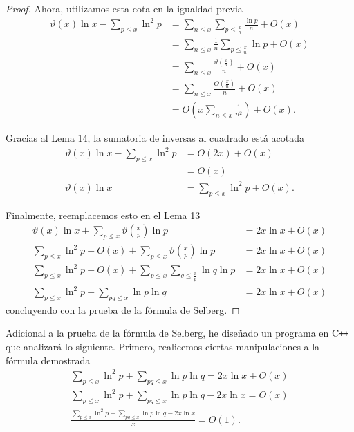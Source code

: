 \documentclass{article}
\theoremstyle{definition}
\theoremstyle{remark}
\begin{document}
\begin{proof}
Ahora, utilizamos esta cota en la igualdad previa
\begin{align*}
\vartheta(x)\ln x - \sum_{p \leq x} \ln^2 p &= \sum_{n \leq x} \sum_{p \leq \frac{x}{n}} \frac{\ln p}{n} + O(x) \\
&= \sum_{n \leq x} \frac{1}{n}\sum_{p \leq \frac{x}{n}} \ln p + O(x) \\
&= \sum_{n \leq x} \frac{\vartheta\left(\frac{x}{n}\right)}{n} + O(x) \\
&= \sum_{n \leq x} \frac{O\left(\frac{x}{n}\right)}{n} + O(x) \\
&= O\left(x \sum_{n \leq x} \frac{1}{n^2}\right) + O(x).
\end{align*}

Gracias al Lema 14, la sumatoria de inversas al cuadrado est\'a acotada
\begin{align*}
\vartheta(x)\ln x - \sum_{p \leq x} \ln^2 p &= O(2x) + O(x) \\
&= O(x)\\
\vartheta(x)\ln x &= \sum_{p \leq x} \ln^2 p + O(x).
\end{align*}

Finalmente, reemplacemos esto en el Lema 13
\begin{align*}
\vartheta(x)\ln x + \sum_{p \leq x} \vartheta\left(\frac{x}{p}\right)\ln p &= 2x\ln x + O(x) \\
\sum_{p \leq x} \ln^2 p + O(x) + \sum_{p \leq x} \vartheta\left(\frac{x}{p}\right)\ln p &= 2x\ln x + O(x) \\
\sum_{p \leq x} \ln^2 p + O(x) + \sum_{p \leq x} \sum_{q \leq \frac{x}{p}} \ln q \ln p &= 2x\ln x + O(x) \\
\sum_{p \leq x} \ln^2 p + \sum_{pq \leq x} \ln p \ln q &= 2x\ln x + O(x)
\end{align*}
concluyendo con la prueba de la f\'ormula de Selberg.
\end{proof}

\newpage
Adicional a la prueba de la f\'ormula de Selberg, he dise\~nado un programa en C\texttt{++}
que analizar\'a lo siguiente. Primero, realicemos ciertas manipulaciones a la f\'ormula demostrada
\begin{gather*}
\sum_{p \leq x} \ln^2 p + \sum_{pq \leq x} \ln p \ln q = 2x\ln x + O(x) \\
\sum_{p \leq x} \ln^2 p + \sum_{pq \leq x} \ln p \ln q - 2x\ln x = O(x) \\
\frac{\sum_{p \leq x} \ln^2 p + \sum_{pq \leq x} \ln p \ln q - 2x\ln x}{x} = O(1).
\end{gather*}
\end{document}
